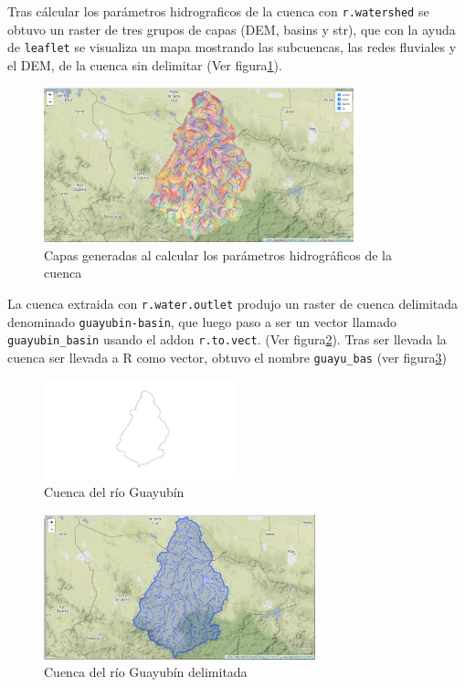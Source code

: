 \documentclass[11pt,]{article}
\begin{document}
Tras cálcular los parámetros hidrograficos de la cuenca con
\texttt{r.watershed} se obtuvo un raster de tres grupos de capas (DEM,
basins y str), que con la ayuda de \texttt{leaflet} se visualiza un mapa
mostrando las subcuencas, las redes fluviales y el DEM, de la cuenca sin
delimitar (Ver figura\ref{capas}).

\begin{figure}
\centering
\includegraphics[width=0.80000\textwidth]{capas.png}
\caption{Capas generadas al calcular los parámetros hidrográficos de la
cuenca\label{capas}}
\end{figure}

La cuenca extraida con \texttt{r.water.outlet} produjo un raster de
cuenca delimitada denominado \texttt{guayubin-basin}, que luego paso a
ser un vector llamado \texttt{guayubin\_basin} usando el addon
\texttt{r.to.vect}. (Ver figura\ref{cuencavectorial}). Tras ser llevada
la cuenca ser llevada a R como vector, obtuvo el nombre
\texttt{guayu\_bas} (ver figura\ref{cuenca delimitada})

\begin{figure}
\centering
\includegraphics[width=0.50000\textwidth]{cuenca extraida.png}
\caption{Cuenca del río Guayubín\label{cuencavectorial}}
\end{figure}

\begin{figure}
\centering
\includegraphics[width=0.70000\textwidth]{cuenca delimitada.png}
\caption{Cuenca del río Guayubín delimitada\label{cuenca delimitada}}
\end{figure}
\end{document}
